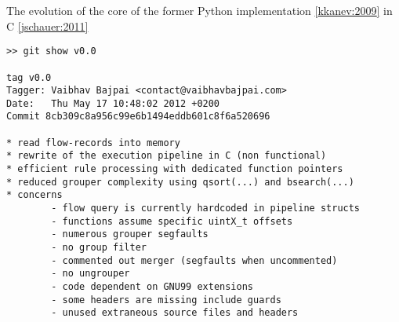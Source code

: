 The evolution of the core of the former Python implementation
\href{https://svn.eecs.jacobs-university.de/svn/eecs/archive/msc-2009/kkanev.pdf}{{[}kkanev:2009{]}}
in C
\href{http://dl.dropbox.com/u/500389/mthesis/jschauer-thesis.pdf}{{[}jschauer:2011{]}}

\begin{lstlisting}
>> git show v0.0                                                                                                                                                                                   

tag v0.0
Tagger: Vaibhav Bajpai <contact@vaibhavbajpai.com>
Date:   Thu May 17 10:48:02 2012 +0200
Commit 8cb309c8a956c99e6b1494eddb601c8f6a520696

* read flow-records into memory
* rewrite of the execution pipeline in C (non functional)
* efficient rule processing with dedicated function pointers
* reduced grouper complexity using qsort(...) and bsearch(...)
* concerns
        - flow query is currently hardcoded in pipeline structs
        - functions assume specific uintX_t offsets
        - numerous grouper segfaults
        - no group filter
        - commented out merger (segfaults when uncommented)
        - no ungrouper
        - code dependent on GNU99 extensions
        - some headers are missing include guards
        - unused extraneous source files and headers
\end{lstlisting}

